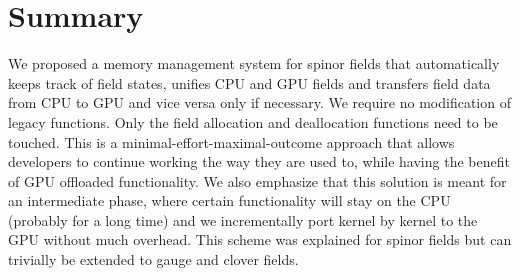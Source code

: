 \section{Summary}
\label{sec:mm:summary}

We proposed a memory management system for spinor fields that automatically keeps track of field states, unifies CPU and GPU fields and transfers field data from CPU to GPU and vice versa only if necessary.
We require no modification of legacy \openqxd functions.
Only the field allocation and deallocation functions need to be touched.
This is a minimal-effort-maximal-outcome approach that allows \openqxd developers to continue working the way they are used to, while having the benefit of GPU offloaded functionality.
We also emphasize that this solution is meant for an intermediate phase, where certain functionality will stay on the CPU (probably for a long time) and we incrementally port kernel by kernel to the GPU without much overhead.
This scheme was explained for spinor fields but can trivially be extended to gauge and clover fields.
